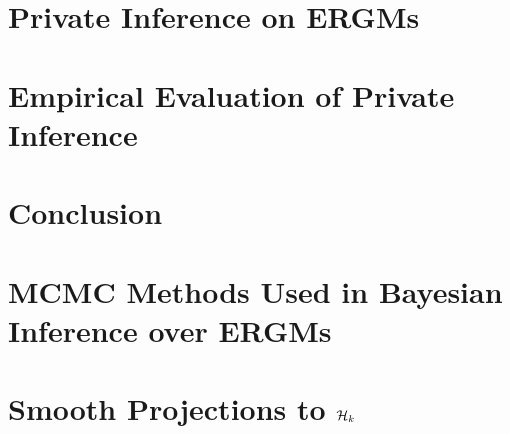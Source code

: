 \documentclass[12pt]{report}
\begin{document}
	
	\chapter{Private Inference on ERGMs}\label{ch:dp_stats}
	
	
	
	
	\chapter{Empirical Evaluation of Private Inference}\label{ch:experiments}
	
	
	
	\chapter{Conclusion}\label{conclusion}
	
	
	
	\cleardoublepage
	
	\nocite{*}
	\printbibliography	
	
	
		
		\appendix
		
		\chapter{MCMC Methods Used in Bayesian Inference over ERGMs}\label{appendix_mcmc}
		
		
		
		\chapter{Smooth Projections to $\mathcal{H}_k$}\label{appendix_projections}
		
		
	
\end{document}
